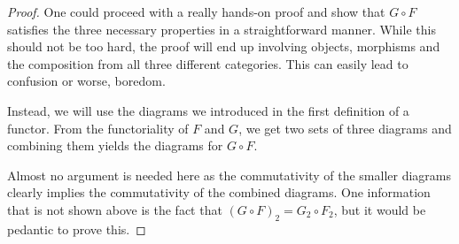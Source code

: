 \documentclass{article}
\theoremstyle{definition}
\theoremstyle{remark}
\begin{document}
\begin{proof}
	One could proceed with a really hands-on proof and show that $G \circ F$ satisfies the three necessary properties in a straightforward manner. While this should not be too hard, the proof will end up involving objects, morphisms and the composition from all three different categories. This can easily lead to confusion or worse, boredom.
	
	Instead, we will use the diagrams we introduced in the first definition of a functor. From the functoriality of $F$ and $G$, we get two sets of three diagrams and combining them yields the diagrams for $G \circ F$.
	
	\begin{figure}[h!]
		\centering
		\quad
		\quad
	\end{figure}

	Almost no argument is needed here as the commutativity of the smaller diagrams clearly implies the commutativity of the combined diagrams. One information that is not shown above is the fact that $(G\circ F)_2 = G_2 \circ F_2$, but it would be pedantic to prove this.
\end{proof}
\end{document}

